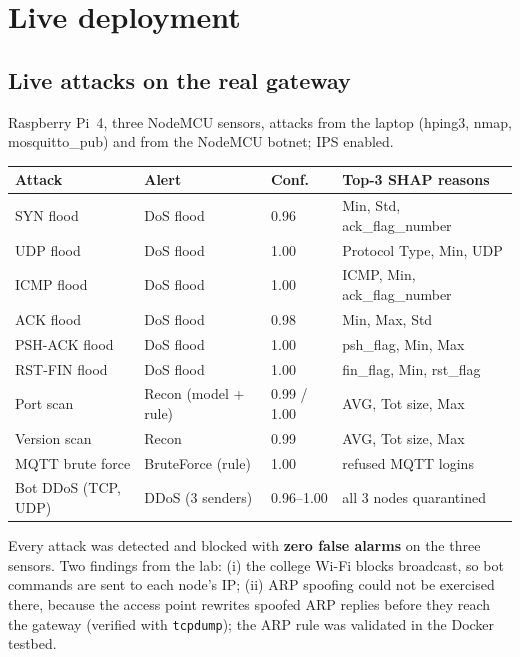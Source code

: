 \documentclass[11pt,a4paper]{article}
\begin{document}
\section{Live deployment}

\subsection{Live attacks on the real gateway}

Raspberry Pi~4, three NodeMCU sensors, attacks from the laptop (hping3, nmap, mosquitto\_pub) and from the NodeMCU
botnet; IPS enabled.

\begin{center}
\small\setlength{\tabcolsep}{4pt}
\begin{tabular}{llll}
\toprule
Attack & Alert & Conf. & Top-3 SHAP reasons \\
\midrule
SYN flood & DoS flood & 0.96 & Min, Std, ack\_flag\_number \\
UDP flood & DoS flood & 1.00 & Protocol Type, Min, UDP \\
ICMP flood & DoS flood & 1.00 & ICMP, Min, ack\_flag\_number \\
ACK flood & DoS flood & 0.98 & Min, Max, Std \\
PSH-ACK flood & DoS flood & 1.00 & psh\_flag, Min, Max \\
RST-FIN flood & DoS flood & 1.00 & fin\_flag, Min, rst\_flag \\
Port scan & Recon (model + rule) & 0.99 / 1.00 & AVG, Tot size, Max \\
Version scan & Recon & 0.99 & AVG, Tot size, Max \\
MQTT brute force & BruteForce (rule) & 1.00 & refused MQTT logins \\
Bot DDoS (TCP, UDP) & DDoS (3 senders) & 0.96--1.00 & all 3 nodes quarantined \\
\bottomrule
\end{tabular}
\end{center}

Every attack was detected and blocked with \textbf{zero false alarms} on the three sensors. Two findings from the
lab: (i) the college Wi-Fi blocks broadcast, so bot commands are sent to each node's IP; (ii) ARP spoofing could not
be exercised there, because the access point rewrites spoofed ARP replies before they reach the gateway (verified
with \texttt{tcpdump}); the ARP rule was validated in the Docker testbed.
\end{document}
